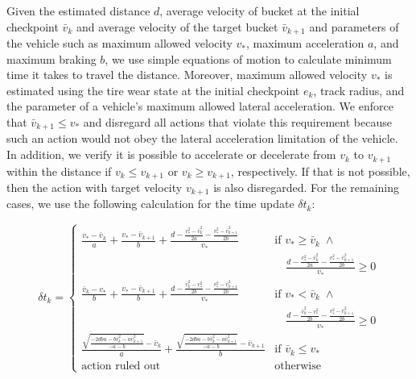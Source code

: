 Given the estimated distance $d$, average velocity of bucket at the initial checkpoint $\bar{v}_k$ and average velocity of the target bucket $\bar{v}_{k+1}$ and parameters of the vehicle such as maximum allowed velocity $v_*$, maximum acceleration $a$, and maximum braking $b$, we use simple equations of motion to calculate minimum time it takes to travel the distance.  Moreover, maximum allowed velocity $v_*$ is estimated using the tire wear state at the initial checkpoint $e_k$, track radius, and the parameter of a vehicle's maximum allowed lateral acceleration. We enforce that $\bar{v}_{k+1} \leq v_*$ and disregard all actions that violate this requirement because such an action would not obey the lateral acceleration limitation of the vehicle. In addition, we verify it is possible to accelerate or decelerate from $v_k$ to $v_{k+1}$ within the distance if $v_k \leq v_{k+1}$ or $v_k \geq v_{k+1}$, respectively. If that is not possible, then the action with target velocity $v_{k+1}$ is also disregarded. For the remaining cases, we use the following calculation for the time update $\delta t_k$:

\begin{equation} \label{eq:time_update}
    \delta t_{k} = \begin{cases}
    \frac{v_*-\bar{v}_k}{a} + \frac{v_*-\bar{v}_{k+1}}{b} + \frac{d-\frac{v_*^2-\bar{v}_k^2}{2a} - \frac{v_*^2-\bar{v}_{k+1}^2}{2b}}{v_*} 
    &  \text{if } v_* \geq \bar{v}_k \; \wedge \\
     &\quad \frac{d-\frac{v_*^2-\bar{v}_k^2}{2a} - \frac{v_*^2-\bar{v}_{k+1}^2}{2b}}{v_*} \geq 0 \\
    \frac{\bar{v}_k -v_*}{b} + \frac{v_*-\bar{v}_{k+1}}{b} + \frac{d-\frac{\bar{v}_k^2 -v_*^2}{2b} - \frac{v_*^2-\bar{v}_{k+1}^2}{2b}}{v_*} 
    &  \text{if } v_* < \bar{v}_k \;\wedge \\
    &\quad \frac{d-\frac{\bar{v}_k^2 -v_*^2}{2b} - \frac{v_*^2-\bar{v}_{k+1}^2}{2b}}{v_*} \geq 0 \\
    \frac{\sqrt{\frac{-2dba -b\bar{v}_k^2 -a\bar{v}_{k+1}^2}{-a-b}}-\bar{v}_{k}}{a} + \frac{\sqrt{\frac{-2dba -b\bar{v}_k^2 -a\bar{v}_{k+1}^2}{-a-b}}-\bar{v}_{k+1}}{b}
    & \text{if } \bar{v}_k \leq v_* \\
    \text{action ruled out}
    & \text{otherwise}
    \end{cases}
\end{equation}

